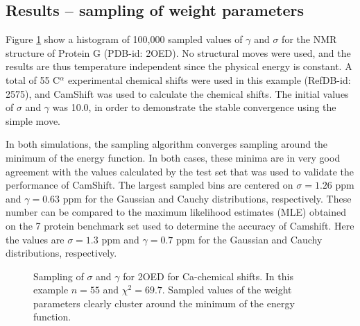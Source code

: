 \subsection{Results -- sampling of weight parameters}
Figure \ref{fig:example} show a histogram of 100,000 sampled values of $\gamma$ and $\sigma$ for the NMR structure of Protein G (PDB-id: 2OED). 
No structural moves were used, and the results are thus temperature independent since the physical energy is constant.
A total of 55 C$^\alpha$ experimental chemical shifts were used in this example (RefDB-id: 2575), and CamShift was used to calculate the chemical shifts. 
The initial values of $\sigma$ and $\gamma$ was 10.0, in order to demonstrate the stable convergence using the simple move.

In both simulations, the sampling algorithm converges sampling around the minimum of the energy function.
In both cases, these minima are in very good agreement with the values calculated by the test set that was used to validate the performance of CamShift.
The largest sampled bins are centered on $\sigma = 1.26$ ppm and $\gamma = 0.63$ ppm for the Gaussian and Cauchy distributions, respectively.
These number can be compared to the maximum likelihood estimates (MLE) obtained on the 7 protein benchmark set used to determine the accuracy of Camshift.
Here the values are $\sigma = 1.3$ ppm and $\gamma = 0.7$ ppm for the Gaussian and Cauchy distributions, respectively.


\begin{figure}%
    \centering
    \qquad
    \caption{Sampling of $\sigma$ and $\gamma$ for 2OED for Ca-chemical shifts. In this example $n = 55$ and $\chi^2 = 69.7$. Sampled values of the weight parameters clearly cluster around the minimum of the energy function.}
    \label{fig:example}%
\end{figure}

